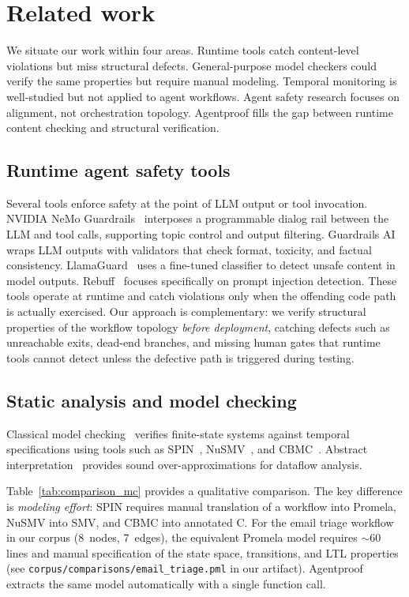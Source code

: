 \section{Related work}
\label{sec:related_work}

We situate our work within four areas. Runtime tools catch
content-level violations but miss structural defects. General-purpose
model checkers could verify the same properties but require manual
modeling. Temporal monitoring is well-studied but not applied to agent
workflows. Agent safety research focuses on alignment, not
orchestration topology. Agentproof fills the gap between runtime
content checking and structural verification.

\subsection{Runtime agent safety tools}

Several tools enforce safety at the point of LLM output or tool invocation.
NVIDIA NeMo Guardrails~\citep{nemo_guardrails} interposes a programmable
dialog rail between the LLM and tool calls, supporting topic control and
output filtering.
Guardrails AI~\citep{guardrails_ai} wraps LLM outputs with validators
that check format, toxicity, and factual consistency.
LlamaGuard~\citep{llamaguard} uses a fine-tuned classifier to detect
unsafe content in model outputs.
Rebuff~\citep{rebuff} focuses specifically on prompt injection detection.
These tools operate at runtime and catch violations only when the
offending code path is actually exercised.
Our approach is complementary: we verify structural properties of the
workflow topology \emph{before deployment}, catching defects such as
unreachable exits, dead-end branches, and missing human gates that
runtime tools cannot detect unless the defective path is triggered
during testing.

\subsection{Static analysis and model checking}

Classical model checking~\citep{clarke1999modelchecking} verifies
finite-state systems against temporal specifications using tools such as
SPIN~\citep{holzmann1997spin}, NuSMV~\citep{cimatti2002nusmv}, and
CBMC~\citep{cbmc}. Abstract interpretation~\citep{cousot1977abstract}
provides sound over-approximations for dataflow analysis.

Table~\ref{tab:comparison_mc} provides a qualitative comparison.
The key difference is \emph{modeling effort}: SPIN requires manual
translation of a workflow into Promela, NuSMV into SMV, and CBMC into
annotated C. For the email triage workflow in our corpus (8~nodes,
7~edges), the equivalent Promela model requires ${\sim}60$ lines and
manual specification of the state space, transitions, and LTL
properties (see \texttt{corpus/comparisons/email\_triage.pml} in our
artifact). Agentproof extracts the same model automatically with a
single function call.

